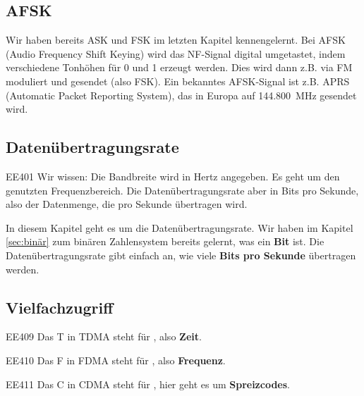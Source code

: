 \subsection{AFSK}
\begin{ohmchapter}
Wir haben bereits ASK und FSK im letzten Kapitel kennengelernt.
Bei AFSK (Audio Frequency Shift Keying) wird das NF-Signal digital umgetastet, indem verschiedene Tonhöhen für 0 und 1 erzeugt werden. Dies wird dann z.B. via FM moduliert und gesendet (also FSK).
Ein bekanntes AFSK-Signal ist z.B. APRS (Automatic Packet Reporting System), das in Europa auf \SI{144,800}{\mega\hertz} gesendet wird.

\end{ohmchapter}

\subsection{Datenübertragungsrate}

\begin{sol}{EE401}
Wir wissen: Die Bandbreite wird in Hertz angegeben. Es geht um den genutzten Frequenzbereich. Die Datenübertragungsrate aber in Bits pro Sekunde, also der Datenmenge, die pro Sekunde übertragen wird.

\end{sol}

\begin{ohmchapter}
  In diesem Kapitel geht es um die Datenübertragungsrate. Wir haben im Kapitel \ref{sec:binär} zum binären Zahlensystem bereits gelernt, was ein \textbf{Bit} ist. 
  Die Datenübertragungsrate gibt einfach an, wie viele \textbf{Bits pro Sekunde} übertragen werden.
\end{ohmchapter}  


\subsection{Vielfachzugriff}

\begin{sol}{EE409}
Das T in TDMA steht für , also \textbf{Zeit}.
\end{sol}

\begin{sol}{EE410}
Das F in FDMA steht für , also \textbf{Frequenz}.
\end{sol}

\begin{sol}{EE411}
Das C in CDMA steht für , hier geht es um  \textbf{Spreizcodes}.
\end{sol}

